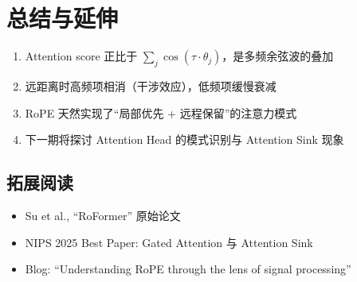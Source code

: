 \section{总结与延伸}

\begin{enumerate}
  \item Attention score 正比于 $\sum_j \cos(\tau \cdot \theta_j)$，是多频余弦波的叠加
  \item 远距离时高频项相消（干涉效应），低频项缓慢衰减
  \item RoPE 天然实现了``局部优先 + 远程保留''的注意力模式
  \item 下一期将探讨 Attention Head 的模式识别与 Attention Sink 现象
\end{enumerate}

\subsection{拓展阅读}
\begin{itemize}
  \item Su et al., ``RoFormer'' 原始论文
  \item NIPS 2025 Best Paper: Gated Attention 与 Attention Sink
  \item Blog: ``Understanding RoPE through the lens of signal processing''
\end{itemize}



